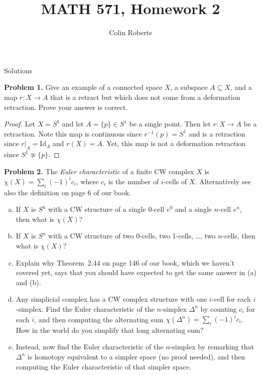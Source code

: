 \documentclass[leqno]{article}
\author{Colin Roberts}
\title{MATH 571, Homework 2}
\theoremstyle{nonumberplain}
\newtheorem{proof}{Proof}
\newcommand{\id}{\mathrm{Id}}
\begin{document}
\maketitle
\begin{large}
\begin{center}
Solutions
\end{center}
\end{large}


\noindent\textbf{Problem 1.} Give an example of a connected space $X$, a subspace $A\subseteq X$, and a map $r\colon X\to A$ that is a retract but which does not come from a deformation retraction. Prove your answer is correct.

\begin{proof}
Let $X=S^1$ and let $A=\{p\}\in S^1$ be a single point. Then let $r\colon X \to A$ be a retraction.  Note this map is continuous since $r^{-1}(p)=S^1$ and is a retraction since $r\vert_A = \id_A$ and $r(X)=A$.  Yet, this map is not a deformation retraction since $S^1 \not\simeq \{p\}$.
\end{proof}

\vspace*{1cm}


\noindent\textbf{Problem 2.} The \emph{Euler characteristic} of a finite CW complex $X$ is $\chi(X)=\sum_i (-1)^i c_i$, where $c_i$ is the number of $i$-cells of $X$. Alternatively see also the definition on page 6 of our book.
\begin{enumerate}[(a)]
\item If $X$ is $S^n$ with a CW structure of a single 0-cell $e^0$ and a single $n$-cell $e^n$, then what is $\chi(X)$? 
\item If $X$ is $S^n$ with a CW structure of two 0-cells, two 1-cells, \ldots, two $n$-cells, then what is $\chi(X)$?
\item Explain why Theorem~2.44 on page 146 of our book, which we haven't covered yet, says that you should have expected to get the same answer in (a) and (b).
\item Any simplicial complex has a CW complex structure with one $i$-cell for each $i$-simplex. Find the Euler characteristic of the $n$-simplex $\Delta^n$ by counting $c_i$ for each $i$, and then computing the alternating sum $\chi(\Delta^n)=\sum_i (-1)^i c_i$. How in the world do you simplify that long alternating sum?
\item Instead, now find the Euler characteristic of the $n$-simplex by remarking that $\Delta^n$ is homotopy equivalent to a simpler space (no proof needed), and then computing the Euler characteristic of that simpler space.
\end{enumerate}
\end{document}
